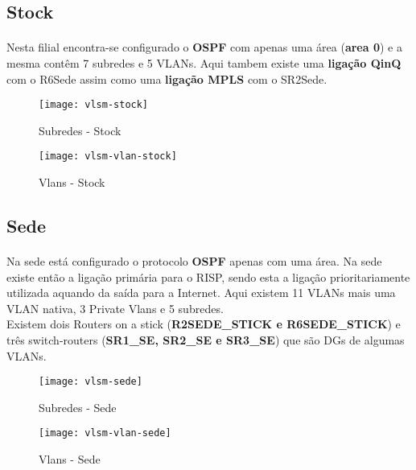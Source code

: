 \documentclass[11pt]{article}
\begin{document}
        \pagebreak
        
	\subsection{Stock}
	\normalsize
	\paragraph{}
        Nesta filial encontra-se configurado o \textbf{OSPF} com apenas uma área (\textbf{area 0}) e a mesma contêm 7 subredes e 5 VLANs. Aqui tambem existe uma \textbf{ligação QinQ} com o R6Sede assim como uma \textbf{ligação MPLS} com o SR2Sede.

        \begin{figure}[h]
          \centering
          \texttt{[image: vlsm-stock]}
          \caption{Subredes - Stock}
          \label{fig.nav}
        \end{figure}

        \begin{figure}[h]
          \centering
          \texttt{[image: vlsm-vlan-stock]}
          \caption{Vlans - Stock}
          \label{fig.nav}
	\end{figure}


        \subsection{Sede}
        \normalsize
        \paragraph{}
        Na sede está configurado o protocolo \textbf{OSPF} apenas com uma área. Na sede existe então a ligação primária para o RISP, sendo esta a ligação prioritariamente utilizada aquando da saída para a Internet. Aqui existem 11 VLANs mais uma VLAN nativa, 3 Private Vlans e 5 subredes.\\
        Existem dois Routers on a stick (\textbf{R2SEDE\_STICK e R6SEDE\_STICK}) e três switch-routers (\textbf{SR1\_SE, SR2\_SE e SR3\_SE}) que são DGs de algumas VLANs.

        \begin{figure}[h]
          \centering
          \texttt{[image: vlsm-sede]}
          \caption{Subredes - Sede}
          \label{fig.nav}
        \end{figure}

        \begin{figure}[h]
          \centering
          \texttt{[image: vlsm-vlan-sede]}
          \caption{Vlans - Sede}
          \label{fig.nav}
	\end{figure}
\end{document}
